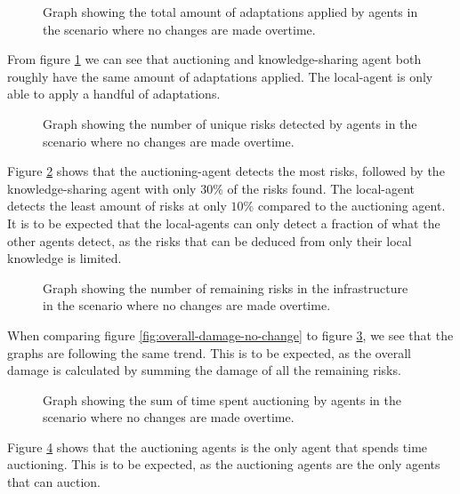 \begin{figure}[H]
    \centering
    
    \caption{Graph showing the total amount of adaptations applied by agents in the scenario where no changes are made overtime.}
    \label{fig:proposals-no-change}
\end{figure}

From figure \ref{fig:proposals-no-change} we can see that auctioning and knowledge-sharing agent both roughly have the same amount of adaptations applied. The local-agent is only able to apply a handful of adaptations.

\begin{figure}[H]
    \centering
        
    \caption{Graph showing the number of unique risks detected by agents in the scenario where no changes are made overtime.}
    \label{fig:risk-count-no-change}
\end{figure}

Figure \ref{fig:risk-count-no-change} shows that the auctioning-agent detects the most risks, followed by the knowledge-sharing agent with only $30\%$ of the risks found. The local-agent detects the least amount of risks at only $10\%$ compared to the auctioning agent. It is to be expected that the local-agents can only detect a fraction of what the other agents detect, as the risks that can be deduced from only their local knowledge is limited.

\begin{figure}[H]
    \centering
        
    \caption{Graph showing the number of remaining risks in the infrastructure in the scenario where no changes are made overtime.}
    \label{fig:risk-remaining-no-change}
\end{figure}

When comparing figure \ref{fig:overall-damage-no-change} to figure \ref{fig:risk-remaining-no-change}, we see that the graphs are following the same trend. This is to be expected, as the overall damage is calculated by summing the damage of all the remaining risks.

\begin{figure}[H]
    \centering
        
    \caption{Graph showing the sum of time spent auctioning by agents in the scenario where no changes are made overtime.}
    \label{fig:auctioning-time-no-change}
\end{figure}

Figure \ref{fig:auctioning-time-no-change} shows that the auctioning agents is the only agent that spends time auctioning. This is to be expected, as the auctioning agents are the only agents that can auction.

